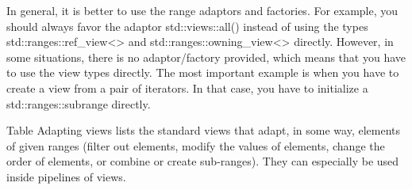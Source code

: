In general, it is better to use the range adaptors and factories. For example, you should always favor the adaptor std::views::all() instead of using the types std::ranges::ref\_view<> and std::ranges::owning\_view<> directly. However, in some situations, there is no adaptor/factory provided, which means that you have to use the view types directly. The most important example is when you have to create a view from a pair of iterators. In that case, you have to initialize a std::ranges::subrange directly.


Table Adapting views lists the standard views that adapt, in some way, elements of given ranges (filter out elements, modify the values of elements, change the order of elements, or combine or create sub-ranges). They can especially be used inside pipelines of views.


